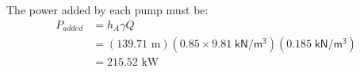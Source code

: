 \documentclass[10pt, onesided]{amsart}
\begin{document}
	
	
	
	
	
	
	
	
	
	
	The power added by each pump must be:
	\begin{align*}
		P_{added} & = h_A\gamma Q                                                                \\
		          & = (139.71\text{ m})(0.85\times9.81\;\mathsf{kN/m^3})(0.185\;\mathsf{kN/m^3}) \\
		          & = 215.52\text{ kW}                                                           
	\end{align*}
	
	
\end{document}
